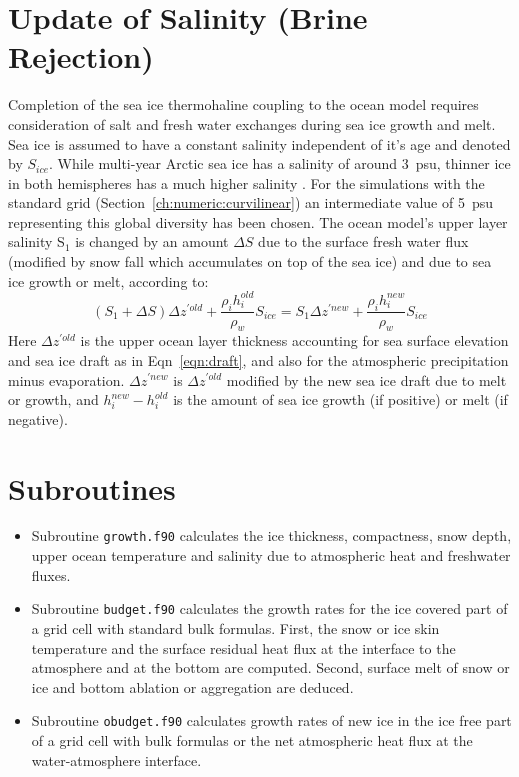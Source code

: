 \section{Update of Salinity (Brine Rejection)}
\label{ch:ice:brine}
Completion of the sea ice thermohaline coupling to the ocean model
requires consideration of salt and fresh water exchanges during
sea ice growth and melt.
Sea ice is assumed to have a constant salinity independent of it's age
and denoted by $S_{\mathit{ice}}$.
While multi-year Arctic sea ice has a salinity of around 3~psu,
thinner ice in both hemispheres has a much higher salinity \citep{cox74,eicken92}.
For the simulations with the standard grid (Section~\ref{ch:numeric:curvilinear}) an intermediate value of 5~psu 
representing this global diversity has been chosen.
The ocean model's upper layer salinity S$_1$ is changed by an amount
$\Delta S$ due to the surface fresh water flux (modified by snow fall
which accumulates on top of the sea ice) and due to sea ice growth or melt,
according to:
\begin{equation}
\label{eqn:icesalt}
\left( S_1 + \Delta S \right) \Delta z^{\prime \mathit{old}}
+ \frac{\rho_i h_i^{\mathit{old}}}{\rho_w} S_{\mathit{ice}}
=
S_1 \Delta z^{\prime \mathit{new}}
+ \frac{\rho_i h_i^{\mathit{new}}}{\rho_w} S_{\mathit{ice}}
\end{equation}
Here $\Delta z^{\prime \mathit{old}}$ is the
upper ocean layer thickness accounting for sea surface
elevation and sea ice draft as in Eqn~\ref{eqn:draft},
and also for the atmospheric precipitation minus evaporation.
$\Delta z^{\prime \mathit{new}}$ is $\Delta z^{\prime \mathit{old}}$
modified by the new sea ice draft due to melt or growth,
and $h_i^{\mathit{new}} - h_i^{\mathit{old}}$ is the amount of
sea ice growth (if positive) or melt (if negative).

\section{Subroutines}
\label{ch:ice:subroutines}
\begin{itemize}
\item
Subroutine \texttt{growth.f90} calculates the ice thickness, compactness, snow depth, upper ocean
temperature and salinity due to atmospheric heat and freshwater fluxes.
\item
 Subroutine \texttt{budget.f90} calculates the growth rates for the ice covered part of a grid
cell with standard bulk formulas. First, the snow or ice skin temperature and the surface residual heat flux
at the interface to the atmosphere and at the bottom are computed. Second, surface melt of snow or ice 
and bottom ablation or aggregation are deduced.        
\item
 Subroutine \texttt{obudget.f90} calculates growth rates of new ice in the ice free part of a grid
cell with bulk formulas or the net atmospheric heat flux at the water-atmosphere interface.
      
\end{itemize}

\clearpage



  
